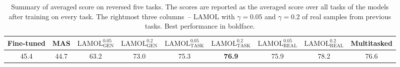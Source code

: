 \begin{table}[h]
\centering
    \begin{adjustbox}{max width=\textwidth}
    \begin{tabular}{*{6}{c}||ccc}
    \toprule
    \small Fine-tuned & \small MAS & \small $\text{LAMOL}_{\text{GEN}}^{0.05}$ & \small $\text{LAMOL}_{\text{GEN}}^{0.2}$ & \small $\text{LAMOL}_{\text{TASK}}^{0.05}$ & \small $\text{LAMOL}_{\text{TASK}}^{0.2}$ & \small $\text{LAMOL}_{\text{REAL}}^{0.05}$ & \small $\text{LAMOL}_{\text{REAL}}^{0.2}$ & \small Multitasked \\
    \midrule
    45.4 & 44.7 & 63.2 & 73.0 & 75.3 & \textbf{76.9} & 75.9 & 78.2 & 76.6 \\
    \bottomrule
    \end{tabular}
    \end{adjustbox}
    \caption{Summary of averaged score on reversed five tasks. The scores are reported as the averaged score over all tasks of the models after training on every task. The rightmost three columns~-- LAMOL with $\gamma = 0.05$ and $\gamma = 0.2$ of real samples from previous tasks. Best performance in boldface.}
\label{tab:r_five_tasks}
\end{table}